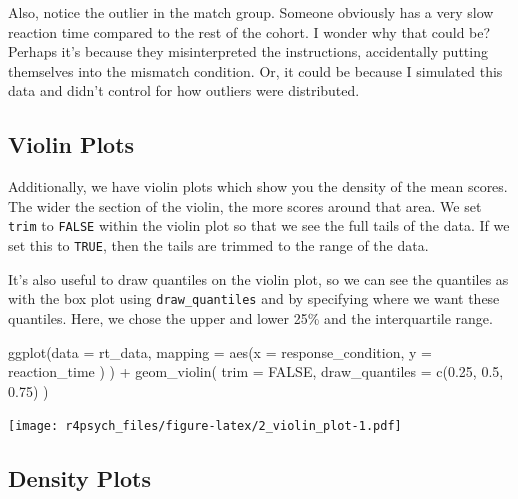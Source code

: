\documentclass[
]{book}
\newenvironment{Shaded}{\begin{snugshade}}{\end{snugshade}}
\newcommand{\AttributeTok}[1]{\textcolor[rgb]{0.77,0.63,0.00}{#1}}
\newcommand{\ConstantTok}[1]{\textcolor[rgb]{0.00,0.00,0.00}{#1}}
\newcommand{\FloatTok}[1]{\textcolor[rgb]{0.00,0.00,0.81}{#1}}
\newcommand{\FunctionTok}[1]{\textcolor[rgb]{0.00,0.00,0.00}{#1}}
\newcommand{\NormalTok}[1]{#1}
\newcommand{\SpecialCharTok}[1]{\textcolor[rgb]{0.00,0.00,0.00}{#1}}
\begin{document}
Also, notice the outlier in the match group. Someone obviously has a very slow reaction time compared to the rest of the cohort. I wonder why that could be? Perhaps it's because they misinterpreted the instructions, accidentally putting themselves into the mismatch condition. Or, it could be because I simulated this data and didn't control for how outliers were distributed.

\hypertarget{violin-plots}{%
\subsection{Violin Plots}\label{violin-plots}}

Additionally, we have violin plots which show you the density of the mean scores. The wider the section of the violin, the more scores around that area. We set \texttt{trim} to \texttt{FALSE} within the violin plot so that we see the full tails of the data. If we set this to \texttt{TRUE}, then the tails are trimmed to the range of the data.

It's also useful to draw quantiles on the violin plot, so we can see the quantiles as with the box plot using \texttt{draw\_quantiles} and by specifying where we want these quantiles. Here, we chose the upper and lower 25\% and the interquartile range.

\begin{Shaded}
\begin{Highlighting}[]
\FunctionTok{ggplot}\NormalTok{(}\AttributeTok{data =}\NormalTok{ rt\_data, }
       \AttributeTok{mapping =} \FunctionTok{aes}\NormalTok{(}\AttributeTok{x =}\NormalTok{ response\_condition, }
                     \AttributeTok{y =}\NormalTok{ reaction\_time}
\NormalTok{                     )}
\NormalTok{       ) }\SpecialCharTok{+}
  \FunctionTok{geom\_violin}\NormalTok{(}
    \AttributeTok{trim =} \ConstantTok{FALSE}\NormalTok{,}
    \AttributeTok{draw\_quantiles =} \FunctionTok{c}\NormalTok{(}\FloatTok{0.25}\NormalTok{, }\FloatTok{0.5}\NormalTok{, }\FloatTok{0.75}\NormalTok{)}
\NormalTok{    )}
\end{Highlighting}
\end{Shaded}

\texttt{[image: r4psych\_files/figure-latex/2\_violin\_plot-1.pdf]}

\hypertarget{density-plots}{%
\subsection{Density Plots}\label{density-plots}}
\end{document}
